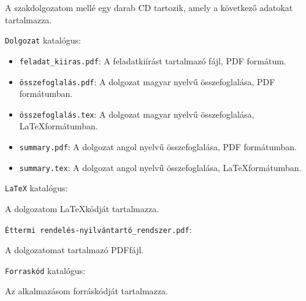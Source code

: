 
A szakdolgozatom mellé egy darab CD tartozik, amely a következő adatokat tartalmazza.

\bigskip

\noindent \texttt{Dolgozat} katalógus:

\begin{itemize}
\item \texttt{feladat\_kiiras.pdf}: A feladatkiírást tartalmazó fájl, PDF formátum.
\item \texttt{összefoglalás.pdf}: A dolgozat magyar nyelvű összefoglalása, PDF formátumban.
\item \texttt{összefoglalás.tex}: A dolgozat magyar nyelvű összefoglalása, \LaTeX formátumban.
\item \texttt{summary.pdf}: A dolgozat angol nyelvű összefoglalása, PDF formátumban.
\item \texttt{summary.tex}: A dolgozat angol nyelvű összefoglalása, \LaTeX formátumban.
\end{itemize}

\bigskip

\noindent \texttt{LaTeX} katalógus:

A dolgozatom \LaTeX kódját tartalmazza.

\bigskip

\noindent \texttt{Éttermi rendelés-nyilvántartó\_rendszer.pdf}:

A dolgozatomat tartalmazó PDFfájl.

\bigskip

\noindent \texttt{Forraskód} katalógus:

Az alkalmazásom forráskódját tartalmazza.
